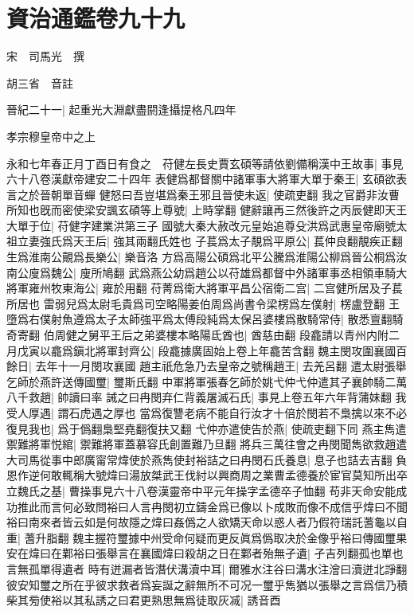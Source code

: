 \section{資治通鑑卷九十九}
宋　司馬光　撰

胡三省　音註

晉紀二十一|{
	起重光大淵獻盡閼逢攝提格凡四年}


孝宗穆皇帝中之上

永和七年春正月丁酉日有食之　苻健左長史賈玄碩等請依劉備稱漢中王故事|{
	事見六十八卷漢獻帝建安二十四年}
表健爲都督關中諸軍事大將軍大單于秦王|{
	玄碩欲表言之於晉朝單音蟬}
健怒曰吾豈堪爲秦王邪且晉使未返|{
	使疏吏翻}
我之官爵非汝曹所知也旣而密使梁安諷玄碩等上尊號|{
	上時掌翻}
健辭讓再三然後許之丙辰健即天王大單于位|{
	苻健字建業洪第三子}
國號大秦大赦改元皇始追尊殳洪爲武惠皇帝廟號太祖立妻強氏爲天王后|{
	強其兩翻氏姓也}
子萇爲太子靚爲平原公|{
	萇仲良翻靚疾正翻}
生爲淮南公覿爲長樂公|{
	樂音洛}
方爲高陽公碩爲北平公騰爲淮陽公柳爲晉公桐爲汝南公廋爲魏公|{
	廋所鳩翻}
武爲燕公幼爲趙公以苻雄爲都督中外諸軍事丞相領車騎大將軍雍州牧東海公|{
	雍於用翻}
苻菁爲衛大將軍平昌公宿衛二宫|{
	二宫健所居及子萇所居也}
雷弱兒爲太尉毛貴爲司空略陽姜伯周爲尚書令梁楞爲左僕射|{
	楞盧登翻}
王墮爲右僕射魚遵爲太子太師強平爲太傅段純爲太保呂婆樓爲散騎常侍|{
	散悉亶翻騎奇寄翻}
伯周健之舅平王后之弟婆樓本略陽氐酋也|{
	酋慈由翻}
段龕請以青州内附二月戊寅以龕爲鎭北將軍封齊公|{
	段龕據廣固始上卷上年龕苦含翻}
魏主閔攻圍襄國百餘日|{
	去年十一月閔攻襄國}
趙主祇危急乃去皇帝之號稱趙王|{
	去羌呂翻}
遣太尉張舉乞師於燕許送傳國璽|{
	璽斯氏翻}
中軍將軍張春乞師於姚弋仲弋仲遣其子襄帥騎二萬八千救趙|{
	帥讀曰率}
誡之曰冉閔弃仁背義屠滅石氏|{
	事見上卷五年六年背蒲妹翻}
我受人厚遇|{
	謂石虎遇之厚也}
當爲復讐老病不能自行汝才十倍於閔若不梟擒以來不必復見我也|{
	爲于僞翻梟堅堯翻復扶又翻}
弋仲亦遣使告於燕|{
	使疏吏翻下同}
燕主雋遣禦難將軍悦綰|{
	禦難將軍蓋慕容氏創置難乃旦翻}
將兵三萬往會之冉閔聞雋欲救趙遣大司馬從事中郎廣甯常煒使於燕雋使封裕詰之曰冉閔石氏養息|{
	息子也詰去吉翻}
負恩作逆何敢輒稱大號煒曰湯放桀武王伐紂以興商周之業曹孟德養於宦官莫知所出卒立魏氏之基|{
	曹操事見六十八卷漢靈帝中平元年操字孟德卒子恤翻}
苟非天命安能成功推此而言何必致問裕曰人言冉閔初立鑄金爲已像以卜成敗而像不成信乎煒曰不聞裕曰南來者皆云如是何故隱之煒曰姦僞之人欲矯天命以惑人者乃假符瑞託蓍龜以自重|{
	蓍升脂翻}
魏主握符璽據中州受命何疑而更反眞爲僞取决於金像乎裕曰傳國璽果安在煒曰在鄴裕曰張舉言在襄國煒曰殺胡之日在鄴者殆無孑遺|{
	孑吉列翻孤也單也言無孤單得遺者}
時有迸漏者皆潛伏溝瀆中耳|{
	爾雅水注谷曰溝水注澮曰瀆迸北諍翻}
彼安知璽之所在乎彼求救者爲妄誕之辭無所不可况一璽乎雋猶以張舉之言爲信乃積柴其㫄使裕以其私誘之曰君更熟思無爲徒取灰㓕|{
	誘音酉}
